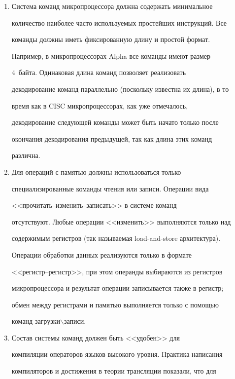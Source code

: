 \begin{enumerate}[1.]


\item Система команд микропроцессора должна содержать минимальное 


количество наиболее часто используемых простейших инструкций. Все 


команды должны иметь фиксированную длину и простой  формат. 


Например, в мик\-ро\-про\-цес\-со\-рах Alpha все команды имеют размер 


4~байта. Одинаковая длина команд позволяет реализовать 


декодирование команд параллельно (поскольку известна их длина), в то 


время как в CISC микропроцессорах, как уже отмечалось, 


декодирование следующей команды может быть начато только после 


окончания декодирования предыдущей, так как длина этих команд  


различна.


  \item Для операций с памятью должны использоваться только 


специализированные команды чтения или записи. Операции вида 


<<про\-чи\-тать--из\-ме\-нить--за\-пи\-сать>> в системе команд 


отсутствуют. Любые операции <<изменить>> выполняются только над 


содержимым регистров (так называемая load-and-store архитектура). 





Операции обработки данных реализуются только в формате 


<<ре\-гистр--ре\-гистр>>, при этом операнды выбираются из регистров 


микропроцессора и результат операции записывается также в регистр;  


обмен между регистрами и памятью выполняется только с помощью 


команд загрузки$\backslash$записи.   


   \item  Состав системы команд должен быть <<удобен>> для 


компиляции операторов языков высокого уровня. Практика написания 


компиляторов и достижения в теории трансляции показали, что для 



\end{enumerate}
